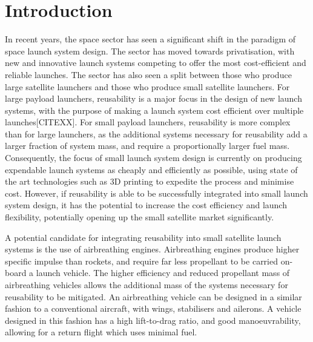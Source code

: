 
\cleardoublepage
\chapter{Introduction}

  	
  	
  	In recent years, the space sector has seen a significant shift in the paradigm of space launch system design. 
  	The sector has moved towards privatisation, with new and innovative launch systems competing to offer the most cost-efficient and reliable launches. 
  	The sector has also seen a split between those who produce large satellite launchers and those who produce small satellite launchers.
  	For large payload launchers, reusability is a major focus in the design of new launch systems, with the purpose of making a launch system cost efficient over multiple launches[CITEXX]. 
  	For small payload launchers, reusability is more complex than for large launchers, as the additional systems necessary for reusability add a larger fraction of system mass, and require a proportionally larger fuel mass. 
  	Consequently, the focus of small launch system design is currently on producing expendable launch systems as cheaply and efficiently as possible, using state of the art technologies such as 3D printing to expedite the process and minimise cost\cite{Niederstrasser2015}.
  	However, if reusability is able to be successfully integrated into small launch system design, it has the potential to increase the cost efficiency and launch flexibility, potentially opening up the small satellite market significantly. 
  	
  	
  	
  	A potential candidate for integrating reusability into small satellite launch systems is the use of airbreathing engines\cite{Smart2009a,Ketsdever2010}.
Airbreathing engines produce higher specific impulse than rockets, and require far less propellant to be carried on-board a launch vehicle\cite{Smart2010}.  	 
  	The higher efficiency and reduced propellant mass of airbreathing vehicles allows the additional mass of the systems necessary for reusability to be mitigated\cite{Curran2003}. An airbreathing vehicle can be designed in a similar fashion to a conventional aircraft, with wings, stabilisers and ailerons\cite{Shaughnessy1990}. A vehicle designed in this fashion has a high lift-to-drag ratio, and good manoeuvrability, allowing for a return flight which uses minimal fuel.
  	
